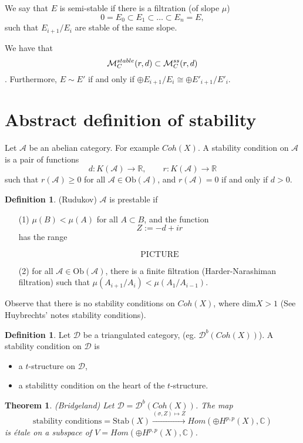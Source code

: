 \documentclass[reqno]{amsart}
\theoremstyle{plain}
\newtheorem{theo}[theorem]{Theorem}
\theoremstyle{definition}
\newtheorem{definition}[theorem]{Definition}
\theoremstyle{remark}
\begin{document}
We say that $E$ is semi-stable if there is a filtration (of slope $\mu$) $$0=E_0\subset E_1\subset \ldots \subset E_n=E,$$ such that $E_{i+1}/E_i$ are stable of the same slope.

We have that $$\mathcal{M}_C^{\tiny{stable}}(r,d)\subset \mathcal{M}_C^{\tiny{ss}}(r,d)$$. Furthermore, $E\sim E'$ if and only if $\oplus E_{i+1}/E_i\cong \oplus E'_{i+1}/E'_i$.

\section*{Abstract definition of stability}
Let $\mathcal{A}$ be an abelian category. For example $Coh(X)$.
A stability condition on $\mathcal{A}$ is a pair of functions
$$d:K(\mathcal{A})\rightarrow \mathbb{R}, \qquad r:K(\mathcal{A})\rightarrow \mathbb{R}$$
such that $r(\mathcal{A})\ge 0$ for all $\mathcal{A}\in \mathrm{Ob}(\mathcal{A})$, and $r(\mathcal{A})=0$ if and only if $d> 0$.

\begin{definition}(Rudukov) $\mathcal{A}$ is prestable if  
\begin{itemize}
\item [(1)] $\mu(B)<\mu(A) $ for all $A\subset B$, and the function$$Z:=-d+ir$$ has  the range 

$$\mathrm{P I C T U R E}$$

\item[(2)] for all $\mathcal{A}\in \mathrm{Ob}(\mathcal{A})$, there is a finite filtration (Harder-Narashiman filtration) such that $\mu(A_{i+1}/A_i)<\mu(A_1/A_{i-1})$.
\end{itemize}
\end{definition}
 

Observe that there is no stability conditions on $Coh(X)$, where dim$X>1$ (See Huybrechts' notes stability conditions).

\begin{definition}
Let $\mathcal{D}$ be a triangulated category, (eg. $\mathcal{D}^b(Coh(X))$). A stability condition on $\mathcal{D}$ is 
\begin{itemize}
\item a $t$-structure on $\mathcal{D}$,

\item a stabilitty condition on the heart of the $t$-structure.
\end{itemize}
\end{definition}

\begin{theo}(Bridgeland) Let $\mathcal{D}=\mathcal{D}^b(Coh(X))$. The map $$\mbox{stability conditions}=\mathrm{Stab}(X)\overset{(\sigma,Z)\mapsto Z}{\longrightarrow}Hom(\oplus H^{p,p}(X),\mathbb{C})$$ is \'etale on a subspace of $V=Hom(\oplus H^{p,p}(X),\mathbb{C})$.
\end{theo}
\end{document}
